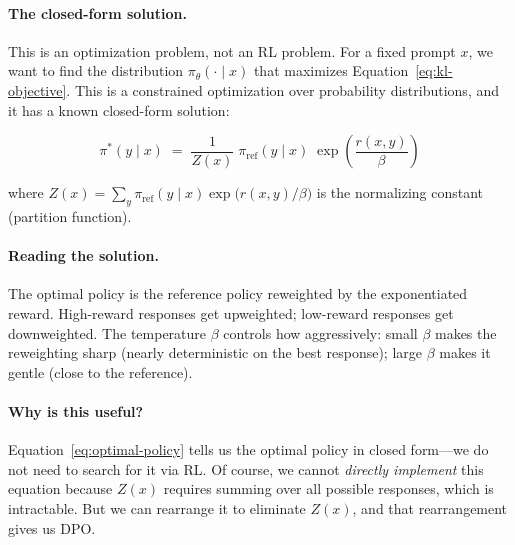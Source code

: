 \paragraph{The closed-form solution.} This is an optimization problem, not an RL problem. For a fixed prompt $x$, we want to find the distribution $\pi_\theta(\cdot \mid x)$ that maximizes Equation~\ref{eq:kl-objective}. This is a constrained optimization over probability distributions, and it has a known closed-form solution:

\begin{equation}
\label{eq:optimal-policy}
\pi^*(y \mid x) \;=\; \frac{1}{Z(x)}\;\pi_{\text{ref}}(y \mid x)\;\exp\!\left(\frac{r(x,y)}{\beta}\right)
\end{equation}

where $Z(x) = \sum_y \pi_{\text{ref}}(y \mid x) \exp\!\bigl(r(x,y)/\beta\bigr)$ is the normalizing constant (partition function).

\paragraph{Reading the solution.} The optimal policy is the reference policy reweighted by the exponentiated reward. High-reward responses get upweighted; low-reward responses get downweighted. The temperature $\beta$ controls how aggressively: small $\beta$ makes the reweighting sharp (nearly deterministic on the best response); large $\beta$ makes it gentle (close to the reference).

\paragraph{Why is this useful?} Equation~\ref{eq:optimal-policy} tells us the optimal policy in closed form---we do not need to search for it via RL. Of course, we cannot \emph{directly implement} this equation because $Z(x)$ requires summing over all possible responses, which is intractable. But we can rearrange it to eliminate $Z(x)$, and that rearrangement gives us DPO.

\noindent{}

